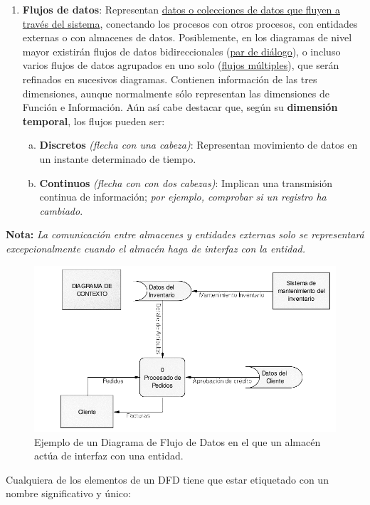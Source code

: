\begin{enumerate}
    \item \textbf{Flujos de datos}: Representan \uline{datos o colecciones de datos que fluyen a través del sistema}, conectando los procesos con otros procesos, con entidades externas o con almacenes de datos. Posiblemente, en los diagramas de nivel mayor existirán flujos de datos bidireccionales (\uline{par de diálogo}), o incluso varios flujos de datos agrupados en uno solo (\uline{flujos múltiples}), que serán refinados en sucesivos diagramas. Contienen información de las tres dimensiones, aunque normalmente sólo representan las dimensiones de Función e Información. Aún así cabe destacar que, según su \textbf{dimensión temporal}, los flujos pueden ser:
          \begin{enumerate}[a.]
              \item \textbf{Discretos} \textit{(flecha con una cabeza)}: Representan movimiento de datos en un instante determinado de tiempo.
              \item \textbf{Continuos} \textit{(flecha con con dos cabezas)}: Implican una transmisión continua de información; \textit{por ejemplo, comprobar si un registro ha cambiado}.
          \end{enumerate}
\end{enumerate}

\textbf{Nota:} \textit{La comunicación entre almacenes y entidades externas solo se representará excepcionalmente cuando el almacén haga de interfaz con la entidad.}

\begin{figure}[h!]
    \centering
    \includegraphics[width=0.8\linewidth]{Resources/Tema5/ejemploDFDInterfazAlmacen.png}
    \caption{Ejemplo de un Diagrama de Flujo de Datos en el que un almacén actúa de interfaz con una entidad.}
    \label{fig:ejemploDFDInterfazAlmacen}
\end{figure}

Cualquiera de los elementos de un DFD tiene que estar etiquetado con un nombre significativo y único:

